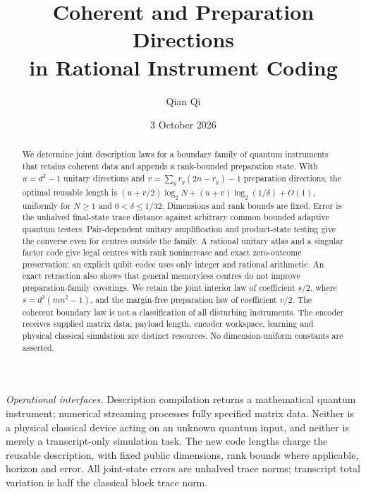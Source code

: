 \documentclass[11pt]{amsart}
\title[Coherent and preparation coding]{Coherent and Preparation Directions\\in Rational Instrument Coding}
\author{Qian Qi}
\date{3 October 2026}
\numberwithin{equation}{section}
\theoremstyle{definition}\newtheorem{definition}[theorem]{Definition}
\theoremstyle{remark}\newtheorem{remark}[theorem]{Remark}
\begin{document}
\raggedbottom
\begin{abstract}
We determine joint description laws for a boundary family of quantum
instruments that retains coherent data and appends a rank-bounded preparation
state. With $u=d^2-1$ unitary directions and
$v=\sum_y r_y(2n-r_y)-1$ preparation directions, the optimal reusable
length is $(u+v/2)\log_2N+(u+v)\log_2(1/\delta)+O(1)$, uniformly for
$N\ge1$ and $0<\delta\le1/32$. Dimensions and rank bounds are fixed.
Error is the unhalved final-state trace distance against arbitrary common
bounded adaptive quantum testers. Pair-dependent unitary amplification and
product-state testing give the converse even for centres outside the family.
A rational unitary atlas and a singular factor code give legal centres with
rank nonincrease and exact zero-outcome preservation; an explicit qubit
codec uses only integer and rational arithmetic. An exact retraction also
shows that general memoryless centres do not improve preparation-family
coverings. We retain the joint interior law of coefficient $s/2$, where
$s=d^2(mn^2-1)$, and the margin-free preparation law of coefficient $v/2$.
The coherent boundary law is not a classification of all disturbing
instruments. The encoder receives supplied matrix data; payload length,
encoder workspace, learning and physical classical simulation are distinct
resources. No dimension-uniform constants are asserted.
\end{abstract}
\maketitle
\noindent\textit{Operational interfaces.}
Description compilation returns a mathematical quantum instrument;
numerical streaming processes fully specified matrix data. Neither is a
physical classical device acting on an unknown quantum input, and
neither is merely a transcript-only simulation task. The new code lengths
charge the reusable description, with fixed public dimensions, rank bounds where applicable, horizon and error.
All joint-state errors
are unhalved trace norms; transcript total variation is half the classical
block trace norm.












\end{document}
